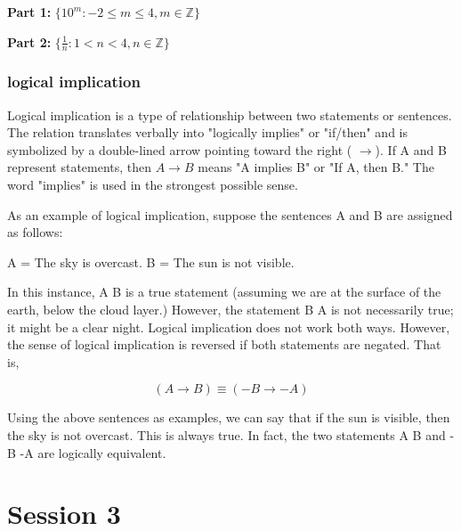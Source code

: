 \documentclass[]{report}
\begin{document}


\vspace{-4cm}
\textbf{Part 1:} $ \{ 10^m : -2 \leq m \leq 4, m \in \mathbb{Z} \} $




\vspace{-4cm}
\textbf{Part 2:} $ \{ \frac{1}{n}: 1 < n < 4, n \in \mathbb{Z} \} $

\subsection{logical implication}


Logical implication is a type of relationship between two statements or sentences. The relation translates verbally into "logically implies" or "if/then" and is symbolized by a double-lined arrow pointing toward the right ( $\rightarrow$). If A and B represent statements, then $A\rightarrow B$ means "A implies B" or "If A, then B." The word "implies" is used in the strongest possible sense.


As an example of logical implication, suppose the sentences A and B are assigned as follows:

A = The sky is overcast.
B = The sun is not visible.

In this instance, A B is a true statement (assuming we are at the surface of the earth, below the cloud layer.) However, the statement B A is not necessarily true; it might be a clear night. Logical implication does not work both ways. However, the sense of logical implication is reversed if both statements are negated. That is,

$$(A \rightarrow B)  \equiv (-B \rightarrow -A)$$

Using the above sentences as examples, we can say that if the sun is visible, then the sky is not overcast. This is always true. In fact, the two statements A B and -B -A are logically equivalent.

\newpage
\chapter{Session 3}
\end{document}
